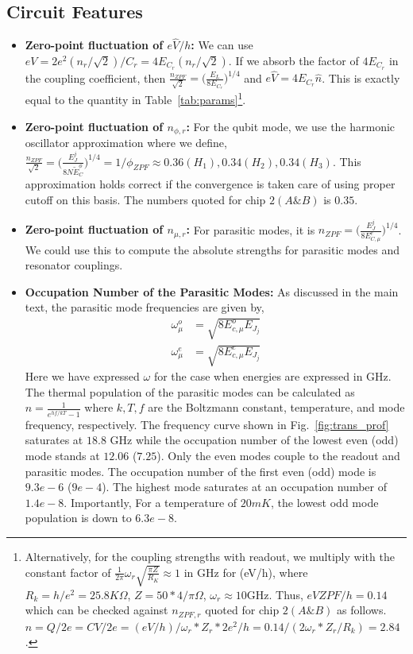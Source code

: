 \documentclass[prx,showpacs,notitlepage,twocolumn,superscriptaddress,nofootinbib,preprintnumbers,floatfix]{revtex4-2}
\begin{document}
\subsection{Circuit Features}
\begin{itemize}
    \item \textbf{Zero-point fluctuation of $e\hat V/h$:} We can use $eV=2e^2(n_r/\sqrt{2})/C_r=4E_{C_r}(n_r/\sqrt{2})$. If we absorb the factor of $4E_{C_r}$ in the coupling coefficient, then $\frac{n_{ZPF}}{\sqrt{2}}=\Big(\frac{E_L}{8E_{C_r}}\Big)^{1/4}$ and $e\hat V=4E_{C_r}\hat n$. This is exactly equal to the quantity in Table~\ref{tab:params}\footnote{Alternatively, for the coupling strengths with readout, we multiply with the constant factor of $\frac{1}{2\pi}\omega_r\sqrt{\frac{\pi Z}{R_K}}\approx 1$ in GHz for (eV/h), where $R_k=h/e^2=25.8K\Omega$, $Z=50*4/\pi\Omega$, $\omega_r\approx 10$GHz. Thus, $eVZPF/h=0.14$ which can be checked against $n_{ZPF,r}$ quoted for chip $2(A\&B)$ as follows. $n=Q/2e=CV/2e=(eV/h)/{\omega_r*Z_r*2e^2/h}=0.14/(2\omega_r*Z_r/R_k)=2.84$.}.
    \item \textbf{Zero-point fluctuation of $n_{\phi,r}$:} For the qubit mode, we use the harmonic oscillator approximation where we define, $\frac{n_{ZPF}}{\sqrt{2}}=\Big(\frac{E_J^j}{8N\tilde{E}_{C}^\phi}\Big)^{1/4}=1/\phi_{ZPF}\approx 0.36(H_1), 0.34 (H_2), 0.34 (H_3)$. This approximation holds correct if the convergence is taken care of using proper cutoff on this basis. The numbers quoted for chip $2(A\&B)$ is $0.35$.
    \item \textbf{Zero-point fluctuation of $n_{\mu,r}$:} For parasitic modes, it is $n_{ZPF}=\Big(\frac{E_J^j}{8E_{C,\mu}^e}\Big)^{1/4}$. We could use this to compute the absolute strengths for parasitic modes and resonator couplings. 

\item\textbf{Occupation Number of the Parasitic Modes:}
As discussed in the main text, the parasitic mode frequencies are given by,
\begin{align}
    \omega^o_\mu&=\sqrt{8E_{c,\mu}^oE_{J_j}}\\
    \omega^e_\mu&=\sqrt{8E_{c,\mu}^eE_{J_j}}
\end{align}
 Here we have expressed $\omega$ for the case when energies are expressed in GHz. The thermal population of the parasitic modes can be calculated as $n=\frac{1}{e^{hf/kT}-1}$ where $k, T, f$ are the Boltzmann constant, temperature, and mode frequency, respectively. The frequency curve shown in Fig.~\ref{fig:trans_prof} saturates at $18.8$ GHz while the occupation number of the lowest even (odd) mode stands at $12.06$ ($7.25$). Only the even modes couple to the readout and parasitic modes. The occupation number of the first even (odd) mode is $9.3e-6$ ($9e-4$). The highest mode saturates at an occupation number of $1.4e-8$. Importantly,  For a temperature of $20mK$, the lowest odd mode population is down to $6.3e-8$.

\end{itemize}
\end{document}
